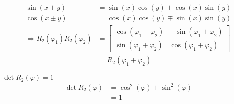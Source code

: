 \begin{enumeralph}
\begin{align*}
	\sin(x\pm y) &= \sin(x)\cos(y) \pm \cos(x)\sin(y)\\
	\cos(x\pm y)&= \cos(x)\cos(y) \mp \sin(x)\sin(y)\\
	\Rightarrow R_2(\varphi_1)R_2(\varphi_2)&=\begin{bmatrix}
	\cos(\varphi_1+\varphi_2) & -\sin(\varphi_1+\varphi_2)\\
	\sin(\varphi_1+\varphi_2) & \cos(\varphi_1+\varphi_2)
	\end{bmatrix}\\
	&=R_2(\varphi_1+ \varphi_2)
	\end{align*}
	\item $\det R_2(\varphi) = 1$
	\begin{align*}
	\det R_2(\varphi)&=\cos^2(\varphi) + \sin^2(\varphi)\\
	&=1
	\end{align*}
\end{enumeralph}

